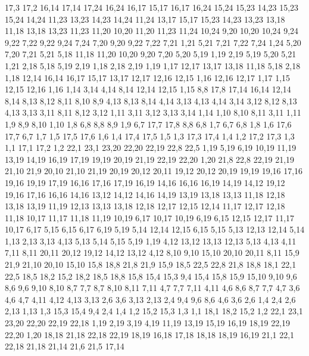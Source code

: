 17,3
17,2
%
16,14
17,14
17,24
16,24
16,17
%
15,17
16,17
16,24
15,24
15,23
%
14,23
15,23
15,24
14,24
%
11,23
13,23
14,23
14,24
11,24
%
13,17
15,17
15,23
14,23
13,23
13,18
%
11,18
13,18
13,23
11,23
11,20
%
10,20
11,20
11,23
11,24
10,24
%
9,20
10,20
10,24
9,24
9,22
%
7,22
9,22
9,24
7,24
%
7,20
9,20
9,22
7,22
7,21
%
1,21
5,21
7,21
7,22
7,24
1,24
%
5,20
7,20
7,21
5,21
%
5,18
11,18
11,20
10,20
9,20
7,20
5,20
5,19
%
1,19
2,19
5,19
5,20
5,21
1,21
%
2,18
5,18
5,19
2,19
%
1,18
2,18
2,19
1,19
%
1,17
12,17
13,17
13,18
11,18
5,18
2,18
1,18
%
12,14
16,14
16,17
15,17
13,17
12,17
12,16
12,15
%
1,16
12,16
12,17
1,17
%
1,15
12,15
12,16
1,16
%
1,14
3,14
4,14
8,14
12,14
12,15
1,15
%
8,8
17,8
17,14
16,14
12,14
8,14
8,13
8,12
8,11
8,10
8,9
%
4,13
8,13
8,14
4,14
%
3,13
4,13
4,14
3,14
%
3,12
8,12
8,13
4,13
3,13
%
3,11
8,11
8,12
3,12
%
1,11
3,11
3,12
3,13
3,14
1,14
%
1,10
8,10
8,11
3,11
1,11
%
1,9
8,9
8,10
1,10
%
1,8
6,8
8,8
8,9
1,9
%
6,7
17,7
17,8
8,8
6,8
%
1,7
6,7
6,8
1,8
%
1,6
17,6
17,7
6,7
1,7
%
1,5
17,5
17,6
1,6
%
1,4
17,4
17,5
1,5
%
1,3
17,3
17,4
1,4
%
1,2
17,2
17,3
1,3
%
1,1
17,1
17,2
1,2
22,1
23,1
23,20
22,20
22,19
22,8
22,5
%
1,19
5,19
6,19
10,19
11,19
13,19
14,19
16,19
17,19
19,19
20,19
21,19
22,19
22,20
1,20
%
21,8
22,8
22,19
21,19
21,10
21,9
%
20,10
21,10
21,19
20,19
20,12
20,11
%
19,12
20,12
20,19
19,19
19,16
%
17,16
19,16
19,19
17,19
%
16,16
17,16
17,19
16,19
%
14,16
16,16
16,19
14,19
%
14,12
19,12
19,16
17,16
16,16
14,16
%
13,12
14,12
14,16
14,19
13,19
13,18
13,13
%
11,18
12,18
13,18
13,19
11,19
%
12,13
13,13
13,18
12,18
12,17
12,15
12,14
%
11,17
12,17
12,18
11,18
%
10,17
11,17
11,18
11,19
10,19
%
6,17
10,17
10,19
6,19
%
6,15
12,15
12,17
11,17
10,17
6,17
%
5,15
6,15
6,17
6,19
5,19
%
5,14
12,14
12,15
6,15
5,15
%
5,13
12,13
12,14
5,14
%
1,13
2,13
3,13
4,13
5,13
5,14
5,15
5,19
1,19
%
4,12
13,12
13,13
12,13
5,13
4,13
%
4,11
7,11
8,11
20,11
20,12
19,12
14,12
13,12
4,12
%
8,10
9,10
15,10
20,10
20,11
8,11
%
15,9
21,9
21,10
20,10
15,10
%
15,8
18,8
21,8
21,9
15,9
%
18,5
22,5
22,8
21,8
18,8
%
18,1
22,1
22,5
18,5
18,2
%
15,2
18,2
18,5
18,8
15,8
15,4
15,3
%
9,4
15,4
15,8
15,9
15,10
9,10
9,6
%
8,6
9,6
9,10
8,10
8,7
%
7,7
8,7
8,10
8,11
7,11
%
4,7
7,7
7,11
4,11
%
4,6
8,6
8,7
7,7
4,7
%
3,6
4,6
4,7
4,11
4,12
4,13
3,13
%
2,6
3,6
3,13
2,13
%
2,4
9,4
9,6
8,6
4,6
3,6
2,6
%
1,4
2,4
2,6
2,13
1,13
%
1,3
15,3
15,4
9,4
2,4
1,4
%
1,2
15,2
15,3
1,3
%
1,1
18,1
18,2
15,2
1,2
22,1
23,1
23,20
22,20
22,19
22,18
%
1,19
2,19
3,19
4,19
11,19
13,19
15,19
16,19
18,19
22,19
22,20
1,20
%
18,18
21,18
22,18
22,19
18,19
%
16,18
17,18
18,18
18,19
16,19
%
21,1
22,1
22,18
21,18
21,14
21,6
21,5
%
17,14
